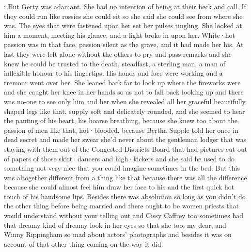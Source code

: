 :
But Gerty was adamant.
She had no intention of being at their beck and
call.
If they could run like rossies she could sit so she said she could
see from where she was.
The eyes that were fastened upon her set
her pulses tingling.
She looked at him a moment,
meeting his glance,
and a light broke in upon her.
White·hot passion was in that face,
passion
silent as the grave,
and it had made her his.
At last they were left
alone without the others to pry and pass remarks and she knew he
could be trusted to the death,
steadfast,
a sterling man,
a man of
inflexible honour to his fingertips.
His hands and face were working
and a tremour went over her.
She leaned back far to look up where
the fireworks were and she caught her knee in her hands so as not
to fall back looking up and there was no-one to see only him and
her when she revealed all her graceful beautifully shaped legs like that,
supply soft and delicately rounded,
and she seemed to hear the panting
of his heart,
his hoarse breathing,
because she knew too
about the passion of men like that,
hot·blooded,
because Bertha Supple told her once
in dead secret
and made her swear she'd never about the gentleman lodger that was
staying with them out of the Congested Districts Board that had pictures
cut out of papers of those skirt·dancers and high·kickers and she said he
used to do something not very nice that you could imagine sometimes in
the bed.
But this was altogether different from a thing like that
because there was all the difference because she could almost feel
him draw her face to his and the first quick hot touch of his
handsome lips.
Besides there was absolution so long as you didn't
do the other thing before being married and there ought to be
women priests
that would understand without your telling out and
Cissy Caffrey too sometimes had that dreamy kind of dreamy look
in her eyes so that she too,
my dear,
and Winny Rippingham so mad
about actors' photographs and besides it was on account of that other
thing coming on the way it did.

